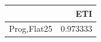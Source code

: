 \begin{tabular}{lr}
\toprule
 & ETI \\
\midrule
Prog,Flat25 & 0.973333 \\
\bottomrule
\end{tabular}
